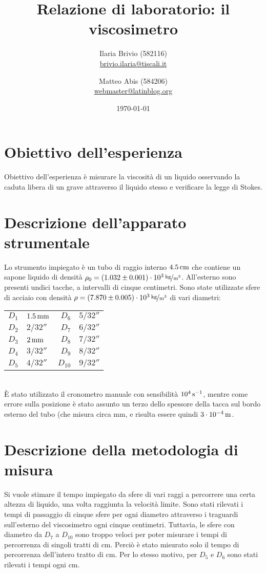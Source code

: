 \documentclass[italian,a4paper]{article}
\begin{document}
\title{Relazione di laboratorio: il viscosimetro}
\author{\normalsize Ilaria Brivio (582116)\\%
\normalsize \url{brivio.ilaria@tiscali.it}%
\and %
\normalsize Matteo Abis (584206)\\ %
\normalsize \url{webmaster@latinblog.org}}
\date{\today}
\maketitle
\section{Obiettivo dell'esperienza}
Obiettivo dell'esperienza è misurare la viscosità di un liquido osservando la caduta libera di un grave attraverso il liquido stesso e verificare la legge di Stokes.
\section{Descrizione dell'apparato strumentale}
Lo strumento impiegato è un tubo di raggio interno $\unit[4.5]{cm}$ che contiene un sapone liquido di densità $\rho_0 = \unitfrac[(1.032\pm0.001)\cdot10^{3}]{kg}{m^3}$. All'esterno sono presenti undici tacche, a intervalli di cinque centimetri. Sono state utilizzate sfere di acciaio con densità $\rho=\unitfrac[(7.870\pm0.005)\cdot10^{3}]{kg}{m^3}$ di vari diametri:
\begin{table}[h]
\centering
\begin{tabular}{r@{ $=$ }l r@{ $=$ }l}
$D_1$ & $\unit[1.5]{mm}$ & $D_6$ & $5/32''$\\
$D_2$ & $2/32''$ &  $D_7$ & $6/32''$\\
$D_3$ & $\unit[2]{mm}$ &  $D_8$ & $7/32''$\\
$D_4$ & $3/32''$ &  $D_9$ & $8/32''$\\
$D_5$ & $4/32''$& $D_{10}$ & $9/32''$\\
\end{tabular}
\end{table}\\
\`E stato utilizzato il cronometro manuale con sensibilità $\unit[10^4]{s^{-1}}$, mentre come errore sulla posizione è stato assunto un terzo dello spessore della tacca sul bordo esterno del tubo (che misura circa \unit[1]{mm}, e risulta essere quindi $\unit[3\cdot10^{-4}]{m}$.
\section{Descrizione della metodologia di misura}
Si vuole stimare il tempo impiegato da sfere di vari raggi a percorrere una certa altezza di liquido, una volta raggiunta la velocità limite.
Sono stati rilevati i tempi di passaggio di cinque sfere per ogni diametro attraverso i traguardi sull'esterno del viscosimetro ogni cinque centimetri. Tuttavia, le sfere con diametro da $D_7$ a $D_{10}$ sono troppo veloci per poter misurare i tempi di percorrenza di singoli tratti di \unit[5]{cm}. Perciò è stato misurato solo il tempo di percorrenza dell'intero tratto di \unit[50]{cm}. Per lo stesso motivo, per $D_5$ e $D_6$ sono stati rilevati i tempi ogni \unit[10]{cm}.
\end{document}
